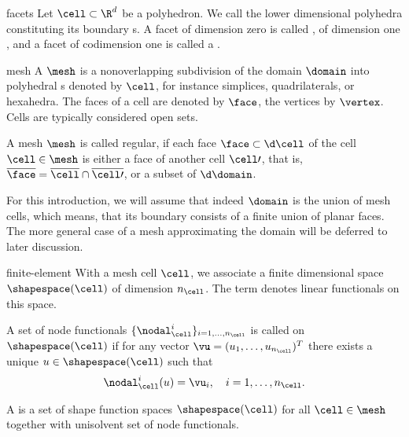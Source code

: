 \begin{Definition}{facets}
  Let $\cell\subset \R^d$ be a polyhedron. We call the lower
  dimensional polyhedra constituting its boundary s. A
  facet of dimension zero is called , of dimension one
  , and a facet of codimension one is called a
  .
\end{Definition}

\begin{Definition}{mesh}
  A  $\mesh$ is a nonoverlapping subdivision of the
  domain $\domain$ into polyhedral s denoted by $\cell$,
  for instance simplices, quadrilaterals, or hexahedra. The
  faces of a cell are denoted by $\face$, the
  vertices by $\vertex$. Cells are typically considered open sets.

  A mesh $\mesh$ is called regular, if each face
  $\face \subset \d\cell$ of the cell $\cell\in\mesh$ is either a
  face of another cell $\cell\prime$, that is,
  $\overline{\face} = \overline{\cell} \cap \overline{\cell\prime}$,
  or a subset of $\d\domain$.
\end{Definition}

\begin{remark}
  For this introduction, we will assume that indeed $\domain$ is the
  union of mesh cells, which means, that its boundary consists of a
  finite union of planar faces. The more general case of a mesh
  approximating the domain will be deferred to later discussion.
\end{remark}

\begin{Definition}{finite-element}
  With a mesh cell $\cell$, we associate a finite dimensional
   space $\shapespace(\cell)$ of dimension
  $n_\cell$. The term  denotes linear
  functionals on this space.

  A set of node functionals $\{\nodal_\cell^i\}_{i=1,\dots,n_\cell}$ is called
   on $\shapespace(\cell)$ if for any vector
  $\vu = (u_1,\dots,u_{n_\cell})^T$ there exists a unique
  $u\in \shapespace(\cell)$ such that
  \begin{gather}
    \nodal_\cell^i(u) = \vu_i,\quad i=1,\dots,n_\cell.
  \end{gather}

  A  is a set of shape function spaces
  $\shapespace(\cell)$ for all $\cell\in\mesh$ together with
  unisolvent set of node functionals.
\end{Definition}

